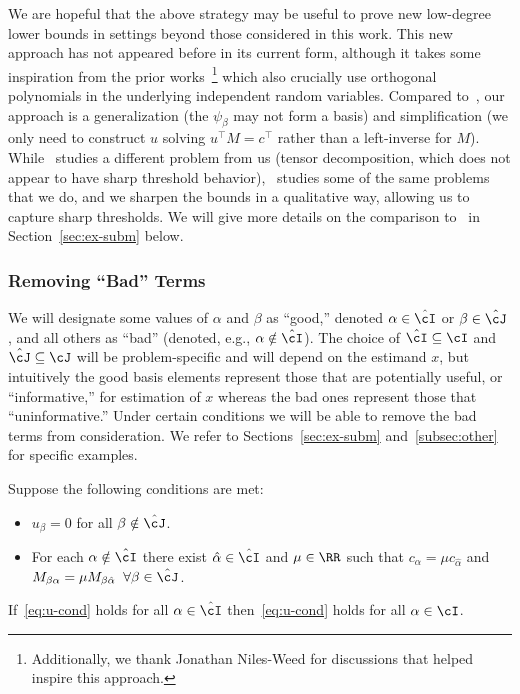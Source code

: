 \documentclass[11pt]{article}
\begin{document}
We are hopeful that the above strategy may be useful to prove new low-degree lower bounds in settings beyond those considered in this work. This new approach has not appeared before in its current form, although it takes some inspiration from the prior works~\cite{SW-estimation,tensor-decomp-LD}\footnote{Additionally, we thank Jonathan Niles-Weed for discussions that helped inspire this approach.} which also crucially use orthogonal polynomials in the underlying independent random variables. Compared to~\cite{tensor-decomp-LD}, our approach is a generalization (the $\psi_\beta$ may not form a basis) and simplification (we only need to construct $u$ solving $u^\top M = c^\top$ rather than a left-inverse for $M$). While~\cite{tensor-decomp-LD} studies a different problem from us (tensor decomposition, which does not appear to have sharp threshold behavior),~\cite{SW-estimation} studies some of the same problems that we do, and we sharpen the bounds in a qualitative way, allowing us to capture sharp thresholds. We will give more details on the comparison to~\cite{SW-estimation} in Section~\ref{sec:ex-subm} below.




\subsubsection{Removing ``Bad'' Terms}

We will designate some values of $\alpha$ and $\beta$ as ``good,'' denoted $\alpha \in \hat\cI$ or $\beta \in \hat\cJ$, and all others as ``bad'' (denoted, e.g., $\alpha \notin \hat\cI$). The choice of $\hat\cI \subseteq \cI$ and $\hat\cJ \subseteq \cJ$ will be problem-specific and will depend on the estimand $x$, but intuitively the good basis elements represent those that are potentially useful, or ``informative,'' for estimation of $x$ whereas the bad ones represent those that ``uninformative.'' Under certain conditions we will be able to remove the bad terms from consideration. We refer to Sections~\ref{sec:ex-subm} and~\ref{subsec:other} for specific examples.

\begin{lemma}\label{lem:disconn}
Suppose the following conditions are met:
\begin{itemize}
\item $u_\beta = 0$ for all $\beta \notin \hat\cJ$.
\item For each $\alpha \notin \hat\cI$ there exist $\hat\alpha \in \hat\cI$ and $\mu \in \RR$ such that $c_\alpha = \mu c_{\hat\alpha}$ and $M_{\beta\alpha} = \mu M_{\beta\hat\alpha} \;\; \forall \beta \in \hat\cJ$.
\end{itemize}
If~\eqref{eq:u-cond} holds for all $\alpha \in \hat\cI$ then~\eqref{eq:u-cond} holds for all $\alpha \in \cI$.
\end{lemma}
\end{document}

